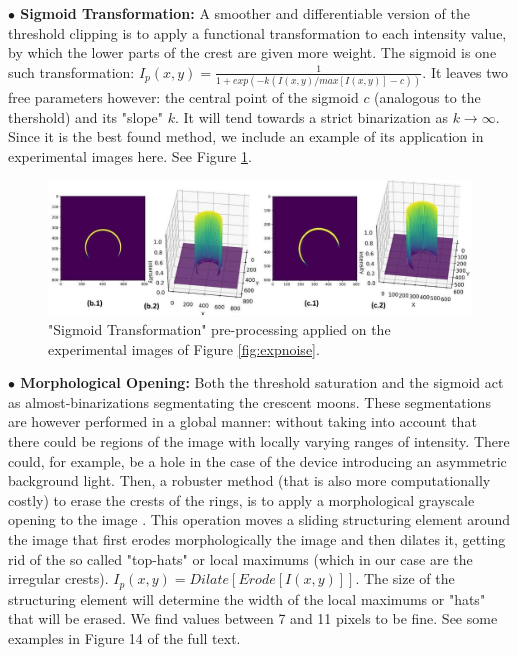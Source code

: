 \documentclass[11pt, a4paper, twoside]{article} %
\begin{document}
{\bf $\bullet$ Sigmoid Transformation:} A smoother and differentiable version of the threshold clipping is to apply a functional transformation to each intensity value, by which the lower parts of the crest are given more weight. The sigmoid is one such transformation: $I_p(x,y)=\frac{1}{1+exp(-k(I(x,y)/max[I(x,y)]-c))}$. It leaves two free parameters however: the central point of the sigmoid $c$ (analogous to the thershold) and its "slope" $k$. It will tend towards a strict binarization as $k\rightarrow \infty$. Since it is the best found method, we include an example of its application in experimental images here. See Figure \ref{fig:preprocessingSigmoid}.\vspace{-0.2cm}
\begin{figure}[h!] 
     \centering 
    \includegraphics[width=0.9\linewidth]{sigmoid.jpg}
    \caption{"Sigmoid Transformation" pre-processing applied on the experimental images of Figure \ref{fig:expnoise}.}
    \label{fig:preprocessingSigmoid}
\end{figure}\vspace{-0.3cm}

{\bf $\bullet$ Morphological Opening:} Both the threshold saturation and the sigmoid act as almost-binarizations segmentating the crescent moons. These segmentations are however performed in a global manner: without taking into account that there could be regions of the image with locally varying ranges of intensity. There could, for example, be a hole in the case of the device introducing an asymmetric background light. Then, a robuster method (that is also more computationally costly) to erase the crests of the rings, is to apply a morphological grayscale opening to the image \cite{opening}. This operation moves a sliding structuring element around the image that first erodes morphologically the image and then dilates it, getting rid of the so called "top-hats" or local maximums (which in our case are the irregular crests). $I_p(x,y)=Dilate[Erode[I(x,y)]]$. The size of the structuring element will determine the width of the local maximums or "hats" that will be erased. We find values between 7 and 11 pixels to be fine. See some examples in Figure 14 of the full text.\vspace{-0.2cm}
\end{document}
